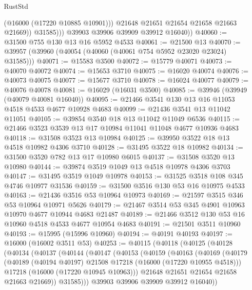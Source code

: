 \begin{lexlean}{RustStd}
\begin{coremodule}
                    (@16000 (@17220 @10885 @10901)))
                  @21648
                  @21651
                  @21654
                  @21658
                  @21663
                  @21669))
              @31585)))
        @39903
        @39906
        @39909
        @39912
        @16040))
@40060 := @31500 @755 @130 @13 @16 @5952 @4533
@40061 := @21500 @13
@40070 := @39957 (@39960 (@40054 (@40060 (@40061 @754 @5952 @23020 @23024) @31585)))
@40071 := @15583 @3500
@40072 := @15779 @40071
@40073 := @40070 @40072
@40074 := @15653 @3710
@40075 := @16020 @40074
@40076 := @40073 @40075
@40077 := @15677 @3710
@40078 := @16024 @40077
@40079 := @40076 @40078
@40081 := @16029 (@16031 @3500)
@40085 := @39946 (@39949 (@40079 @40081 @16040))
@40095 := @21466 @3541 @130 @13 @16 @11053 @4518 @4533 @4677 @10928 @4683
@40099 := @21436 @3541 @13 @11042 @11051
@40105 := @39854 @3540 @18 @13 @11042 @11049 @6536
@40115 := @21466 @3523 @3539 @13 @17 @10984 @11041 @11048 @4677 @10936 @4683
@40118 := @31508 @3523 @13 @10984
@40125 := @39950 @3522 @18 @13 @4518 @10982 @4306 @3710
@40128 := @31495 @3522 @18 @10982
@40134 := @31500 @3520 @782 @13 @17 @10980 @6015
@40137 := @31508 @3520 @13 @10980
@40144 := @39874 @3519 @1049 @13 @4518 @10978 @4306 @3703
@40147 := @31495 @3519 @1049 @10978
@40153 := @31525 @3518 @108 @345 @4746 @10977 @31536
@40159 := @31500 @3516 @130 @53 @16 @10975 @4533
@40163 := @21436 @3516 @53 @10964 @10973
@40169 := @21597 @3515 @346 @53 @10964 @10971 @5626
@40179 := @21467 @3514 @53 @345 @4901 @10963 @10970 @4677 @10944 @4683 @21487
@40189 := @21466 @3512 @130 @53 @16 @10960 @4518 @4533 @4677 @10954 @4683
@40191 := @21501 @3511 @10960
@40193 := @15995 (@15996 @10960)
@40194 := @40191 @40193
@40197 := @16000 (@16002 @3511 @53)
@40253 := @40115
    (@40118
      (@40125
        (@40128
          (@40134
            (@40137
              (@40144
                (@40147
                  (@40153
                    (@40159
                      (@40163
                        (@40169
                          (@40179
                            (@40189 (@40194 @40197) @21508 @17218 (@16000 (@17220 @10955 @4518)))
                            @17218
                            (@16000 (@17220 @10945 @10963)))
                          @21648
                          @21651
                          @21654
                          @21658
                          @21663
                          @21669))
                      @31585)))
                @39903
                @39906
                @39909
                @39912
                @16040))

\end{coremodule}
\end{lexlean}

